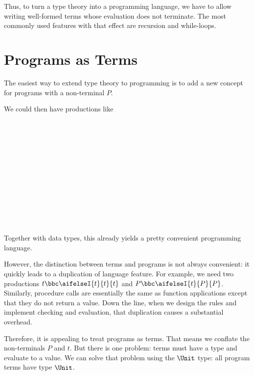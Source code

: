 Thus, to turn a type theory into a programming language, we have to allow writing well-formed terms whose evaluation does not terminate.
The most commonly used features with that effect are recursion and while-loops.

\section{Programs as Terms}

The easiest way to extend type theory to programming is to add a new concept for programs with a non-terminal $P$.

We could then have productions like
\begin{commgrammar}
\\
\\
\\
\\
\\
\\
\\
\\
\\
\\
\\
\end{commgrammar}

Together with data types, this already yields a pretty convenient programming language.

However, the distinction between terms and programs is not always convenient: it quickly leads to a duplication of language feature.
For example, we need two productions $t\bbc \aifelseI{t}{t}{t}$ and $P\bbc \aifelseI{t}{P}{P}$.
Similarly, procedure calls are essentially the same as function applications except that they do not return a value.
Down the line, when we design the rules and implement checking and evaluation, that duplication causes a substantial overhead.
\medskip

Therefore, it is appealing to treat programs as terms.
That means we conflate the non-terminals $P$ and $t$.
But there is one problem: terms must have a type and evaluate to a value.
We can solve that problem using the $\Unit$ type: all program terms have type $\Unit$.

